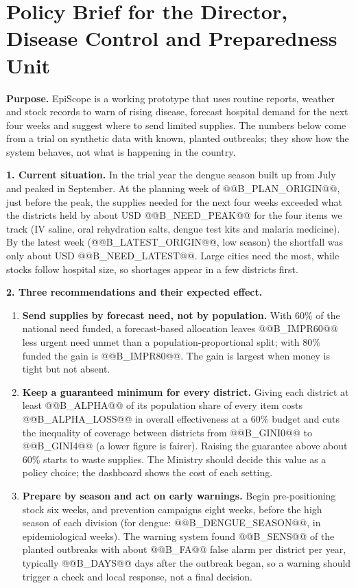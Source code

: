 \appendices
\section{Policy Brief for the Director, Disease Control and Preparedness Unit}\label{app:brief}
\textbf{Purpose.} EpiScope is a working prototype that uses routine reports, weather and stock records to warn of rising disease, forecast hospital demand for the next four weeks and suggest where to send limited supplies. The numbers below come from a trial on synthetic data with known, planted outbreaks; they show how the system behaves, not what is happening in the country.

\textbf{1. Current situation.} In the trial year the dengue season built up from July and peaked in September. At the planning week of @@B_PLAN_ORIGIN@@, just before the peak, the supplies needed for the next four weeks exceeded what the districts held by about USD @@B_NEED_PEAK@@ for the four items we track (IV saline, oral rehydration salts, dengue test kits and malaria medicine). By the latest week (@@B_LATEST_ORIGIN@@, low season) the shortfall was only about USD @@B_NEED_LATEST@@. Large cities need the most, while stocks follow hospital size, so shortages appear in a few districts first.

\textbf{2. Three recommendations and their expected effect.}
\begin{enumerate}
\item \textbf{Send supplies by forecast need, not by population.} With 60\% of the national need funded, a forecast-based allocation leaves @@B_IMPR60@@ less urgent need unmet than a population-proportional split; with 80\% funded the gain is @@B_IMPR80@@. The gain is largest when money is tight but not absent.
\item \textbf{Keep a guaranteed minimum for every district.} Giving each district at least @@B_ALPHA@@ of its population share of every item costs @@B_ALPHA_LOSS@@ in overall effectiveness at a 60\% budget and cuts the inequality of coverage between districts from @@B_GINI0@@ to @@B_GINI4@@ (a lower figure is fairer). Raising the guarantee above about 60\% starts to waste supplies. The Ministry should decide this value as a policy choice; the dashboard shows the cost of each setting.
\item \textbf{Prepare by season and act on early warnings.} Begin pre-positioning stock six weeks, and prevention campaigns eight weeks, before the high season of each division (for dengue: @@B_DENGUE_SEASON@@, in epidemiological weeks). The warning system found @@B_SENS@@ of the planted outbreaks with about @@B_FA@@ false alarm per district per year, typically @@B_DAYS@@ days after the outbreak began, so a warning should trigger a check and local response, not a final decision.
\end{enumerate}

